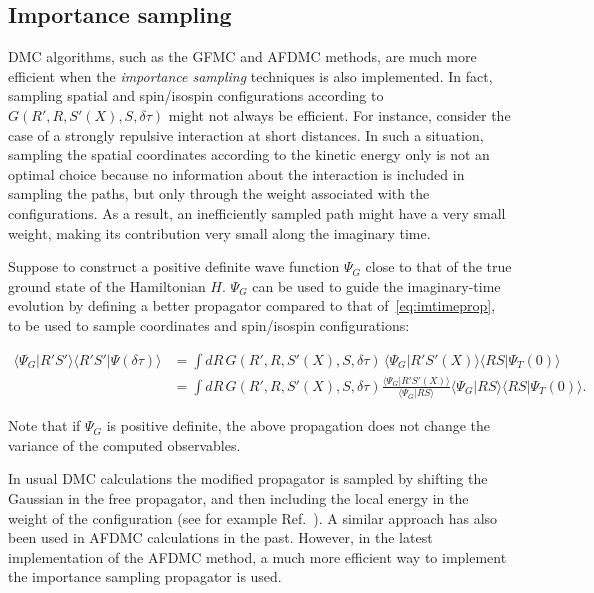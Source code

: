 \documentclass[aps,prc,twocolumn,superscriptaddress,floatfix]{revtex4-1}
\begin{document}
\subsection{Importance sampling}
\label{sec:is}
DMC algorithms, such as the GFMC and AFDMC methods, are much more efficient when the \emph{importance sampling}
techniques is also implemented.
In fact, sampling spatial and spin/isospin configurations according to $G(R',R,S'(X),S,\delta\tau)$ 
might not always be efficient. For instance, consider the case of a strongly repulsive interaction 
at short distances. In such a situation, sampling the spatial coordinates according to the kinetic 
energy only is not an optimal choice because no information about the interaction is included in 
sampling the paths, but only through the weight associated with the configurations. 
As a result, an inefficiently sampled path might have a very small weight, making its contribution 
very small along the imaginary time.

Suppose to construct a positive definite wave function $\Psi_G$ close to that of the true ground state of
the Hamiltonian $H$. $\Psi_G$ can be used to guide the imaginary-time evolution by defining a
better propagator compared to that of~\cref{eq:imtimeprop}, to be used to sample coordinates and 
spin/isospin configurations:
\begin{widetext}
\begin{align}
\langle\Psi_G|R'S'\rangle\langle R'S'|\Psi(\delta\tau)\rangle
&=\displaystyle\int dR\,G(R',R,S'(X),S,\delta\tau)\,\langle\Psi_G|R'S'(X)\rangle\langle RS|\Psi_T(0)\rangle
\nonumber \\
&=\displaystyle\int dR\,G(R',R,S'(X),S,\delta\tau)\frac{\langle\Psi_G|R'S'(X)\rangle}{\langle\Psi_G|RS\rangle}
\langle\Psi_G|RS\rangle\langle RS|\Psi_T(0)\rangle .
\end{align}
\end{widetext}
Note that if $\Psi_G$ is positive definite, the above propagation does not change the 
variance of the computed observables.

In usual DMC calculations the modified propagator is sampled by shifting the Gaussian in
the free propagator, and then including the local energy in the weight of the configuration
(see for example Ref.~\cite{Foulkes:2001}). A similar approach has also been used in AFDMC calculations in the past. 
However, in the latest implementation of the AFDMC method, a much more efficient way to implement the
importance sampling propagator is used.
\end{document}
